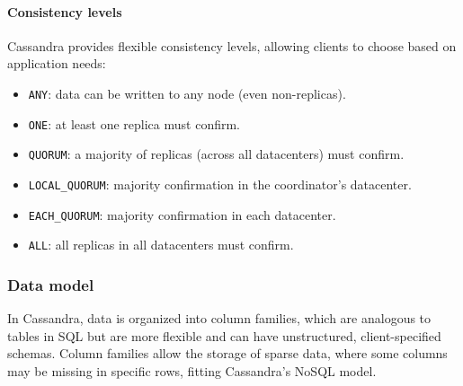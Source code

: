 \paragraph*{Consistency levels}
Cassandra provides flexible consistency levels, allowing clients to choose based on application needs:
\begin{itemize}
    \item \texttt{ANY}: data can be written to any node (even non-replicas).
    \item \texttt{ONE}: at least one replica must confirm.
    \item \texttt{QUORUM}: a majority of replicas (across all datacenters) must confirm.
    \item \texttt{LOCAL\_QUORUM}: majority confirmation in the coordinator's datacenter.
    \item \texttt{EACH\_QUORUM}: majority confirmation in each datacenter.
    \item \texttt{ALL}: all replicas in all datacenters must confirm.
\end{itemize}

\subsubsection{Data model}
In Cassandra, data is organized into column families, which are analogous to tables in SQL but are more flexible and can have unstructured, client-specified schemas. 
Column families allow the storage of sparse data, where some columns may be missing in specific rows, fitting Cassandra's NoSQL model.


